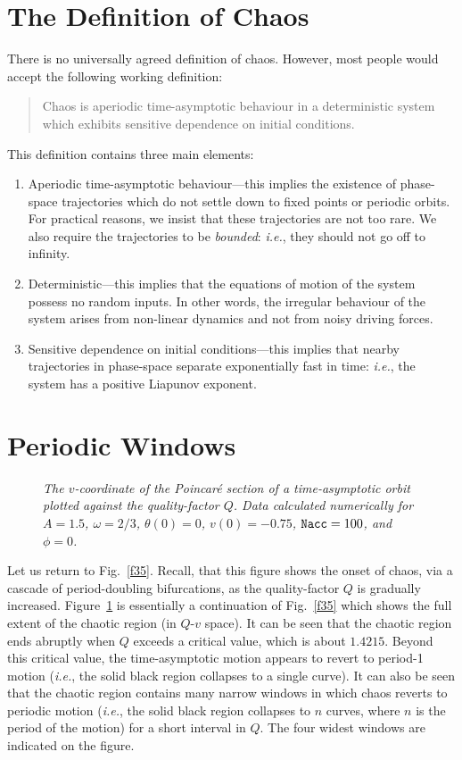 \section{The Definition of Chaos}
There is no universally agreed definition of chaos. However, most people would accept the
following working definition:
\begin{quote}
Chaos is aperiodic time-asymptotic behaviour in a deterministic system which
exhibits sensitive dependence on initial conditions.
\end{quote}
This definition contains three main elements:
\begin{enumerate}
\item {\sf Aperiodic time-asymptotic behaviour}---this implies the existence of
phase-space trajectories which do not settle down to fixed points or
periodic orbits. For practical reasons, we  insist that these trajectories
are not too rare. We also require the trajectories to be {\em bounded}:
{\em i.e.}, they should not go off to infinity. 
\item {\sf Deterministic}---this implies that the equations of motion of the system  possess no
random inputs. In other words, the irregular behaviour of the system   arises
from non-linear dynamics and not from noisy driving forces. 
\item {\sf Sensitive dependence on initial conditions}---this implies that nearby
trajectories in phase-space separate exponentially fast in time: {\em i.e.}, the
system has a positive Liapunov exponent.
\end{enumerate}

\section{Periodic Windows}
\begin{figure}
\epsfysize=3.5in
\centerline{}
\caption{\em The $v$-coordinate of the Poincar\'{e} section of a time-asymptotic orbit
plotted against the quality-factor $Q$. Data
 calculated numerically for
$A=1.5$, $\omega=2/3$, $\theta(0)=0$, $v(0)=-0.75$, ${\tt Nacc} =100$,
 and $\phi=0$.}\label{f44}
\end{figure}

Let us return to Fig.~\ref{f35}. Recall, that this figure shows the onset of
chaos, via a cascade of period-doubling bifurcations, as the quality-factor $Q$
is gradually increased. Figure~\ref{f44} is essentially a continuation of Fig.~\ref{f35}
which shows the full extent of the chaotic region (in $Q$-$v$ space). It can be
seen that the chaotic region ends abruptly when $Q$ exceeds a critical
value, which is about $1.4215$. Beyond this critical value, the time-asymptotic motion appears to
revert to period-1 motion ({\em i.e.}, the solid black region collapses to a single curve). 
It can also be seen that the chaotic region contains many narrow  windows in which
chaos reverts to periodic motion  ({\em i.e.}, the solid black region collapses
to $n$ curves, where $n$ is the period of the motion) for a short interval in $Q$. The four widest
windows are indicated on the figure.


